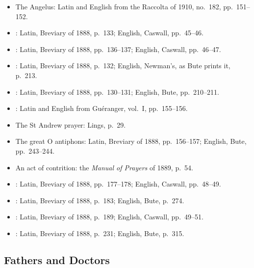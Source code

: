\begin{itemize}[leftmargin=1.3em, itemsep=0.3em]
\item The Angelus: Latin and English from the Raccolta of 1910, no.~182, pp.~151--152.
\item {}: Latin, Breviary of 1888, p.~133; English, Caswall,
pp.~45--46.
\item {}: Latin, Breviary of 1888, pp.~136--137; English, Caswall,
pp.~46--47.
\item {}: Latin, Breviary of 1888, p.~132; English, Newman's, as Bute
prints it, p.~213.
\item {}: Latin, Breviary of 1888, pp.~130--131; English, Bute,
pp.~210--211.
\item {}: Latin and English from Guéranger, vol.~I, pp.~155--156.
\item The St Andrew prayer: Lings, p.~29.
\item The great O antiphons: Latin, Breviary of 1888, pp.~156--157; English, Bute, pp.~243--244.
\item An act of contrition: the \textit{Manual of Prayers} of 1889, p.~54.
\item {}: Latin, Breviary of 1888, pp.~177--178; English, Caswall,
pp.~48--49.
\item {}: Latin, Breviary of 1888, p.~183; English, Bute, p.~274.
\item {}: Latin, Breviary of 1888, p.~189; English, Caswall,
pp.~49--51.
\item {}: Latin, Breviary of 1888, p.~231; English, Bute, p.~315.
\end{itemize}

\subsection{Fathers and Doctors}

